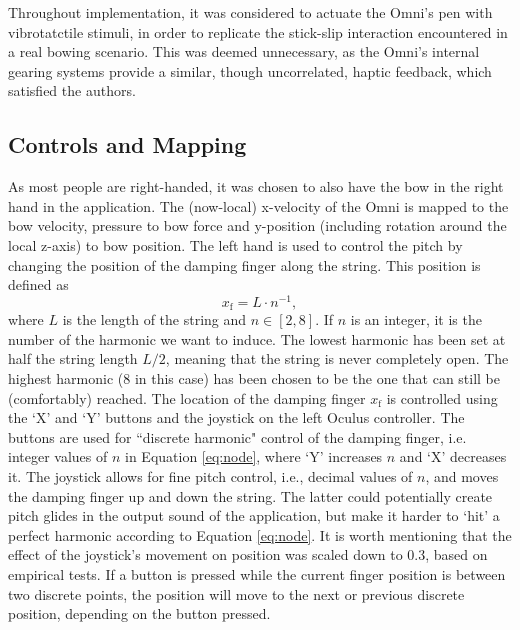 \documentclass[dvipsnames, pdftex]{article}
\begin{document}
Throughout implementation, it was considered to actuate the Omni's pen with vibrotatctile stimuli, in order to replicate the stick-slip interaction encountered in a real bowing scenario. This was deemed unnecessary, as the Omni's internal gearing systems provide a similar, though uncorrelated, haptic feedback, which satisfied the authors.  

\subsection{Controls and Mapping}\label{sec:controls}
As most people are right-handed, it was chosen to also have the bow in the right hand in the application. The (now-local) x-velocity of the Omni is mapped to the bow velocity, pressure to bow force and y-position (including rotation around the local z-axis) to bow position. The left hand is used to control the pitch by changing the position of the damping finger along the string. This position is defined as  
\begin{equation}\label{eq:node}
    x_\text{f} = L\cdot n^{-1},
\end{equation}
where $L$ is the length of the string and $n \in [2,8]$. If $n$ is an integer, it is the number of the harmonic we want to induce. The lowest harmonic has been set at half the string length $L/2$, meaning that the string is never completely open. The highest harmonic (8 in this case) has been chosen to be the one that can still be (comfortably) reached. The location of the damping finger $x_\text{f}$ is controlled using the `X' and `Y' buttons and the joystick on the left Oculus controller. %
The buttons are used for ``discrete harmonic" control of the damping finger, i.e. integer values of $n$ in Equation \eqref{eq:node}, where `Y' increases $n$ and `X' decreases it. The joystick allows for fine pitch control, i.e., decimal values of $n$, and moves the damping finger up and down the string. The latter could potentially create pitch glides in the output sound of the application, but make it harder to `hit' a perfect harmonic according to Equation \eqref{eq:node}. It is worth mentioning that the effect of the joystick's movement on position was scaled down to 0.3, based on empirical tests.  If a button is pressed while the current finger position is between two discrete points, the position will move to the next or previous discrete position, depending on the button pressed.
\end{document}
